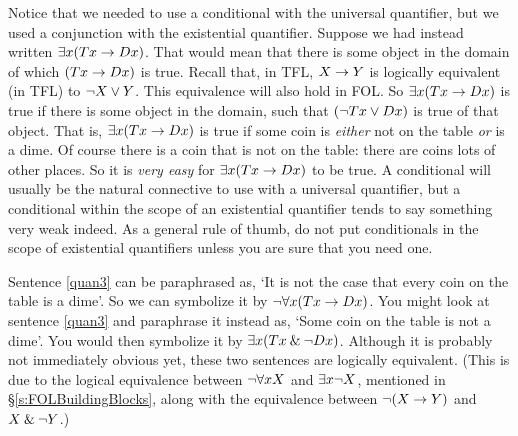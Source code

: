 Notice that we needed to use a conditional with the universal quantifier, but we used a conjunction with the existential quantifier. Suppose we had instead written $\exists x(Tx \rightarrow Dx)$. That would mean that there is some object in the domain of which $(Tx \rightarrow Dx)$ is true. Recall that, in TFL, $X \rightarrow Y$ is logically equivalent (in TFL) to $\neg X \vee Y$. This equivalence will also hold in FOL. So $\exists x(Tx \rightarrow Dx)$ is true if there is some object in the domain, such that $(\neg Tx \vee Dx)$ is true of that object. That is, $\exists x (Tx \rightarrow Dx)$ is true if some coin is \emph{either} not on the table \emph{or} is a dime. Of course there is a coin that is not on the table: there are coins lots of other places. So it is \emph{very easy} for $\exists x(Tx \rightarrow Dx)$ to be true. A conditional will usually be the natural connective to use with a universal quantifier, but a conditional within the scope of an existential quantifier tends to say something very weak indeed. As a general rule of thumb, do not put conditionals in the scope of existential quantifiers unless you are sure that you need one.

Sentence \ref{quan3} can be paraphrased as, `It is not the case that every coin on the table is a dime'. So we can symbolize it by $\neg \forall x(Tx \rightarrow Dx)$. You might look at sentence \ref{quan3} and paraphrase it instead as, `Some coin on the table is not a dime'. You would then symbolize it by $\exists x(Tx \mathbin{\&} \neg Dx)$. Although it is probably not immediately obvious yet, these two sentences are logically equivalent. (This is due to the logical equivalence between $\neg\forall xX$ and $\exists x\neg X$, mentioned in \S\ref{s:FOLBuildingBlocks}, along with the equivalence between $\neg(X\rightarrow Y)$ and $X\mathbin{\&}\neg Y$.)

